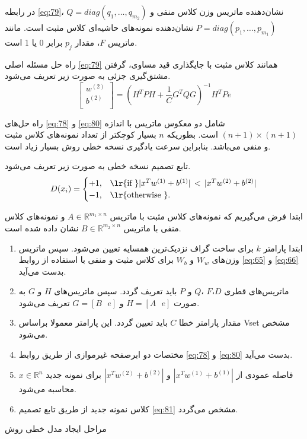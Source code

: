 در رابطه \ref{eq:79}،  $Q=diag(q_1,\dots,q_{m_{2}})$ نشان‌دهنده ماتریس وزن کلاس منفی و  $P=diag(p_1,\dots  ,p_{m_{1}})$ نشان‌دهنده نمونه‌های حاشیه‌ای کلاس مثبت است. مانند ماتریس $F$، مقدار $p_j$  برابر 0 یا 1 است.

راه حل مسئله اصلی \ref{eq:79} همانند کلاس مثبت با جایگذاری قید مساوی، گرفتن مشتق‌گیری جزئی به صورت زیر تعریف می‌شود.
\begin{equation}\label{eq:80}
\left[ \begin{matrix}
{{w}^{\left( 2 \right)}}  \\
{{b}^{\left( 2 \right)}}  \\
\end{matrix} \right] = {{({{H}^{T}}PH+\frac{1}{C}{{G}^{T}}QG)}^{-1}}{{H}^{T}}Pe
\end{equation}

راه حل‌های \ref{eq:78} و \ref{eq:80} شامل دو معکوس ماتریس با اندازه $(n+1)\times (n +1)$ است. بطوریکه $n$ بسیار کوچکتر از تعداد نمونه‌های کلاس مثبت و منفی می‌باشد. بنابراین سرعت یادگیری نسخه خطی روش  بسیار زیاد است.

تابع تصمیم نسخه خطی به صورت زیر تعریف می‌شود.
\begin{equation}\label{eq:81}
D(x_i) =
\begin{cases}
+1, & \textrm{\lr{if }} |{{x}^T}{{w}^{(1)}}+{{b}^{(1)}}|\, < \, |{{x}^T}{{w}^{(2)}}+{{b}^{(2)}}|  \\
-1, & \textrm{\lr{otherwise }}.
\end{cases}
\end{equation}
 
\begin{algorithm}[H]
\begin{minipage}{.92\linewidth}

 	ابتدا فرض می‌گیریم که نمونه‌های کلاس مثبت با ماتریس  $A\in {{\mathbb{R}}^{{{m}_{1}}\times n}}$ و نمونه‌های کلاس منفی با ماتریس  $B\in {{\mathbb{R}}^{{{m}_{2}}\times n}}$ نشان داده شده است.
 	
 	\begin{enumerate}
 		\item ابتدا پارامتر  $k$ برای ساخت گراف نزدیک‌ترین همسایه تعیین می‌شود. سپس ماتریس وزن‌های  $W_{w}$ و   $W_{b}$ برای کلاس مثبت و منفی با استفاده از روابط \ref{eq:65} و \ref{eq:66} بدست می‌آید.
 		\item ماتریس‌های قطری  $D$،$F$ ،$Q$  و $P$ باید تعریف گردد. سپس ماتریس‌های $H$ و  $G$ به صورت  $H=[A\text{ } e]$ و $G=[B\text{ }e]$  تعریف می‌شود.
 		\item مقدار پارامتر خطا $C$ باید تعیین گردد. این پارامتر معمولا براساس \gls{Vset} مشخص می‌شود.
 		\item مختصات دو ابرصفحه غیرموازی از طریق روابط \ref{eq:78} و \ref{eq:80} بدست می‌آید.
 		\item فاصله عمودی از $|{{x}^T}{{w}^{(1)}}+{{b}^{(1)}}|$  و  $|{{x}^T}{{w}^{(2)}}+{{b}^{(2)}}|$ برای نمونه جدید   $x \in \mathbb{R}^{n}$ محاسبه می‌شود.
 		\item کلاس نمونه جدید از طریق تابع تصمیم \ref{eq:81} مشخص می‌گردد.
 	\end{enumerate}
\end{minipage}
\caption{مراحل ایجاد مدل خطی روش }
\end{algorithm}
 
